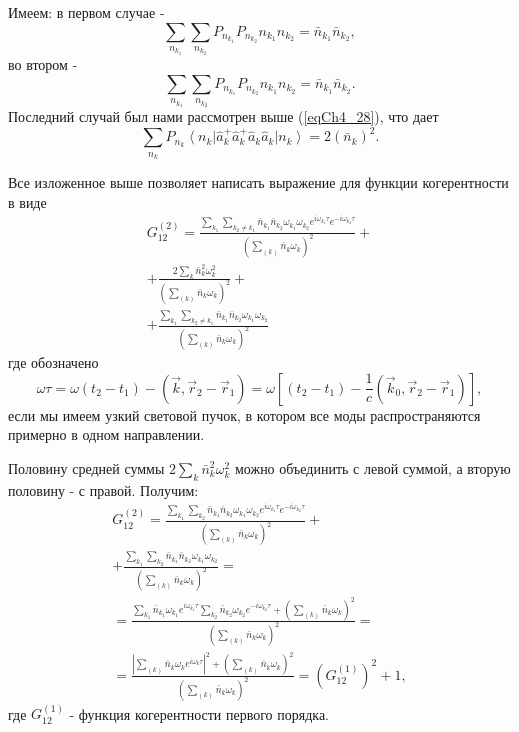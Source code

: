 Имеем: в первом случае -
\begin{equation}
\sum_{n_{k_1}}\sum_{n_{k_2}} P_{n_{k_1}} P_{n_{k_2}} 
n_{k_1} n_{k_2} = \bar{n}_{k_1} \bar{n}_{k_2},
\label{eqCh4_34}
\end{equation}
во втором -
\begin{equation}
\sum_{n_{k_1}}\sum_{n_{k_2}} P_{n_{k_1}} P_{n_{k_2}} 
n_{k_1} n_{k_2} = \bar{n}_{k_1} \bar{n}_{k_2}.
\label{eqCh4_35}
\end{equation}
Последний случай был нами рассмотрен выше (\ref{eqCh4_28}), что дает
\begin{equation}
\sum_{n_{k}} P_{n_{k}}
\left<n_k\right|\hat{a}_k^{+}\hat{a}_k^{+}\hat{a}_k\hat{a}_k\left|n_k\right>
= 2 \left(\bar{n}_k\right)^2.
\label{eqCh4_36}
\end{equation}

Все изложенное выше позволяет написать выражение для функции
когерентности в виде 
\begin{eqnarray}
G_{12}^{(2)} = \frac{\sum_{k_1}\sum_{k_2 \neq k_1} \bar{n}_{k_1}
  \bar{n}_{k_2} \omega_{k_1} \omega_{k_2} e^{i \omega_{k_1} \tau} 
e^{- i \omega_{k_2} \tau} } 
{\left(\sum_{(k)} \bar{n}_k \omega_k\right)^2} + 
\nonumber \\
+
\frac{2 \sum_{k} \bar{n}_{k}^2 \omega_k^2} 
{\left(\sum_{(k)} \bar{n}_k \omega_k\right)^2} + 
\nonumber \\
+
\frac{\sum_{k_1}\sum_{k_2 \neq k_1} \bar{n}_{k_1}
  \bar{n}_{k_2} \omega_{k_1} \omega_{k_2}} 
{\left(\sum_{(k)} \bar{n}_k \omega_k\right)^2}
\label{eqCh4_37}
\end{eqnarray}
где обозначено 
\[
\omega \tau = \omega \left(t_2 - t_1\right) - \left(\vec{k}, \vec{r}_2
- \vec{r}_1\right) = 
\omega \left[
\left(t_2 - t_1\right) - \frac{1}{c}\left(\vec{k}_0, \vec{r}_2
- \vec{r}_1\right)
\right],
\]
если мы имеем узкий световой пучок, в котором все моды
распространяются примерно в одном направлении. 

Половину средней суммы $2 \sum_{k} \bar{n}_{k}^2 \omega_k^2$ можно
объединить с левой суммой, а вторую половину - с правой. Получим: 
\begin{eqnarray}
G_{12}^{(2)} = \frac{\sum_{k_1}\sum_{k_2} \bar{n}_{k_1}
  \bar{n}_{k_2} \omega_{k_1} \omega_{k_2} e^{i \omega_{k_1} \tau} 
e^{- i \omega_{k_2} \tau}} 
{\left(\sum_{(k)} \bar{n}_k \omega_k\right)^2} + 
\nonumber \\
+ \frac{\sum_{k_1}\sum_{k_2} \bar{n}_{k_1}
  \bar{n}_{k_2} \omega_{k_1} \omega_{k_2}} 
{\left(\sum_{(k)} \bar{n}_k \omega_k\right)^2} = 
\nonumber \\
= 
\frac{\sum_{k_1}\bar{n}_{k_1} \omega_{k_1} e^{i \omega_{k_1} \tau}
\sum_{k_2}\bar{n}_{k_2} \omega_{k_2} e^{- i \omega_{k_2} \tau} +
\left(\sum_{(k)} \bar{n}_k \omega_k\right)^2
}
{\left(\sum_{(k)} \bar{n}_k \omega_k\right)^2} = 
\nonumber \\
= \frac{\left|\sum_{(k)}\bar{n}_{k} \omega_{k} e^{i \omega_{k}
  \tau}\right|^2 + \left(\sum_{(k)} \bar{n}_k \omega_k\right)^2}
{\left(\sum_{(k)} \bar{n}_k \omega_k\right)^2} = 
\left(G_{12}^{(1)}\right)^2 + 1,
\label{eqCh4_38}
\end{eqnarray}
где $G_{12}^{(1)}$ - функция когерентности
первого порядка.  

